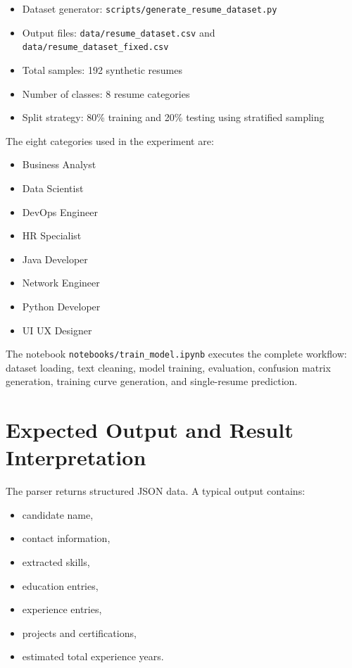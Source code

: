 \documentclass[12pt,a4paper]{article}
\begin{document}
\begin{itemize}[leftmargin=1.5em]
    \item Dataset generator: \texttt{scripts/generate\_resume\_dataset.py}
    \item Output files: \texttt{data/resume\_dataset.csv} and \texttt{data/resume\_dataset\_fixed.csv}
    \item Total samples: 192 synthetic resumes
    \item Number of classes: 8 resume categories
    \item Split strategy: 80\% training and 20\% testing using stratified sampling
\end{itemize}

The eight categories used in the experiment are:
\begin{itemize}[leftmargin=1.5em]
    \item Business Analyst
    \item Data Scientist
    \item DevOps Engineer
    \item HR Specialist
    \item Java Developer
    \item Network Engineer
    \item Python Developer
    \item UI UX Designer
\end{itemize}

The notebook \texttt{notebooks/train\_model.ipynb} executes the complete workflow: dataset loading, text cleaning, model training, evaluation, confusion matrix generation, training curve generation, and single-resume prediction.

\section{Expected Output and Result Interpretation}
The parser returns structured JSON data. A typical output contains:

\begin{itemize}[leftmargin=1.5em]
    \item candidate name,
    \item contact information,
    \item extracted skills,
    \item education entries,
    \item experience entries,
    \item projects and certifications,
    \item estimated total experience years.
\end{itemize}
\end{document}
